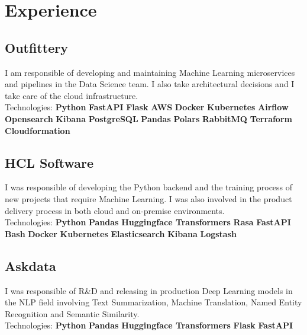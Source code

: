 \documentclass[]{deedy-resume-openfont}
\begin{document}
\begin{minipage}[t]{0.66\textwidth} 


\section{Experience}

\subsection{Outfittery}
I am responsible of developing and maintaining Machine Learning microservices and pipelines in the Data Science team. I also take architectural decisions and I take care of the cloud infrastructure. \\
Technologies: \textbf{Python} \textbullet{} \textbf{FastAPI} \textbullet{} \textbf{Flask} \textbullet{} \textbf{AWS} \textbullet{} \textbf{Docker} \textbullet{} \textbf{Kubernetes} \textbullet{} \textbf{Airflow} \textbullet{} \textbf{Opensearch} \textbullet{} \textbf{Kibana} \textbullet{} \textbf{PostgreSQL} \textbullet{} \textbf{Pandas} \textbullet{} \textbf{Polars} \textbullet{} \textbf{RabbitMQ} \textbullet{} \textbf{Terraform} \textbullet{} \textbf{Cloudformation}
\sectionsep

\subsection{HCL Software}
I was responsible of developing the Python backend and the training process of new projects that require Machine Learning. I was also involved in the product delivery process in both cloud and on-premise environments. \\
Technologies: \textbf{Python} \textbullet{} \textbf{Pandas} \textbullet{} \textbf{Huggingface Transformers} \textbullet{} \textbf{Rasa} \textbullet{} \textbf{FastAPI} \textbullet{} \textbf{Bash} \textbullet{} \textbf{Docker} \textbullet{} \textbf{Kubernetes} \textbullet{} \textbf{Elasticsearch} \textbullet{} \textbf{Kibana} \textbullet{} \textbf{Logstash}
\sectionsep

\subsection{Askdata}
I was responsible of R\&D and releasing in production Deep Learning models in the NLP field involving Text Summarization, Machine Translation, Named Entity Recognition and Semantic Similarity. \\
Technologies: \textbf{Python} \textbullet{} \textbf{Pandas} \textbullet{} \textbf{Huggingface Transformers} \textbullet{} \textbf{Flask} \textbullet{} \textbf{FastAPI}
\sectionsep



\end{minipage}
\end{document}
